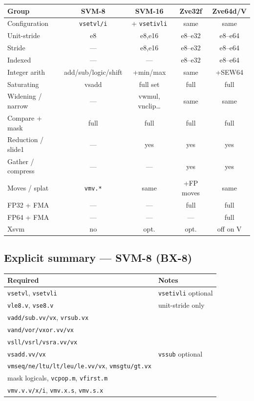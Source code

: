 \begin{center}\small
\begin{tabular}{@{}lcccc@{}}
\toprule
Group & SVM-8 & SVM-16 & Zve32f & Zve64d/V \\
\midrule
Configuration & \texttt{vsetvl/i} & + \texttt{vsetivli} & same & same \\
Unit-stride & e8 & e8,e16 & e8--e32 & e8--e64 \\
Stride & --- & e8,e16 & e8--e32 & e8--e64 \\
Indexed & --- & --- & e8--e32 & e8--e64 \\
Integer arith & add/sub/logic/shift & +min/max & same & +SEW64 \\
Saturating & vsadd & full set & full & full \\
Widening / narrow & --- & vwmul, vnclip\ldots & same & same \\
Compare + mask & full & full & full & full \\
Reduction / slide1 & --- & yes & yes & yes \\
Gather / compress & --- & --- & yes & yes \\
Moves / splat & \texttt{vmv.*} & same & +FP moves & same \\
FP32 + FMA & --- & --- & full & full \\
FP64 + FMA & --- & --- & --- & full \\
Xsvm & no & opt. & opt. & off on V \\
\bottomrule
\end{tabular}
\end{center}

\subsection{Explicit summary --- SVM-8 (BX-8)}

\begin{center}\small
\begin{tabular}{@{}ll@{}}
\toprule
Required & Notes \\
\midrule
\texttt{vsetvl}, \texttt{vsetvli} & \texttt{vsetivli} optional \\
\texttt{vle8.v}, \texttt{vse8.v} & unit-stride only \\
\texttt{vadd/sub.vv/vx}, \texttt{vrsub.vx} & \\
\texttt{vand/vor/vxor.vv/vx} & \\
\texttt{vsll/vsrl/vsra.vv/vx} & \\
\texttt{vsadd.vv/vx} & \texttt{vssub} optional \\
\texttt{vmseq/ne/ltu/lt/leu/le.vv/vx}, \texttt{vmsgtu/gt.vx} & \\
mask logicals, \texttt{vcpop.m}, \texttt{vfirst.m} & \\
\texttt{vmv.v.v/x/i}, \texttt{vmv.x.s}, \texttt{vmv.s.x} & \\
\bottomrule
\end{tabular}
\end{center}

